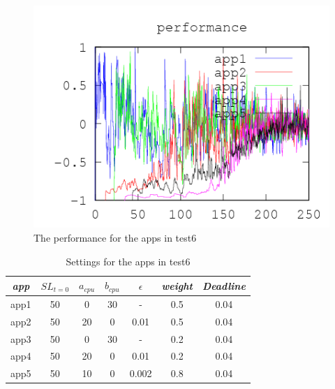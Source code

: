 \documentclass[nobiblatex]{LTHthesis}
\begin{document}
\begin{figure}[!H]
  \centering
  \includegraphics{"tools/plot/logs/test6/f"}
  \caption{The performance for the apps in test6}
  \label{fig:test6_f}
\end{figure}



\begin{table}[h]
  \centering
  \begin{tabular}{|c|c|c|c|c|c|c|}
 	\hline 
   \emph{app} & $SL_{t=0}$ & \textbf{$a_{cpu}$} & \textbf{$b_{cpu}$} & \textbf{$\epsilon$} & \emph{weight} & \emph{Deadline} \\ \hline
	app1 & 50 & 0  & 30 & - 	  & 0.5 &0.04  \\ \hline
	app2 & 50 & 20 & 0  & 0.01  & 0.5 &0.04  \\ \hline
	app3 & 50 & 0  & 30 & - 	  & 0.2 &0.04  \\ \hline
	app4 & 50 & 20 & 0  & 0.01  & 0.2 &0.04  \\ \hline
	app5 & 50 & 10 & 0  & 0.002 & 0.8 &0.04  \\ \hline                
  \end{tabular}
  \caption{Settings for the apps in test6}
  \label{tab:settings_test6}
\end{table}

\end{document}
